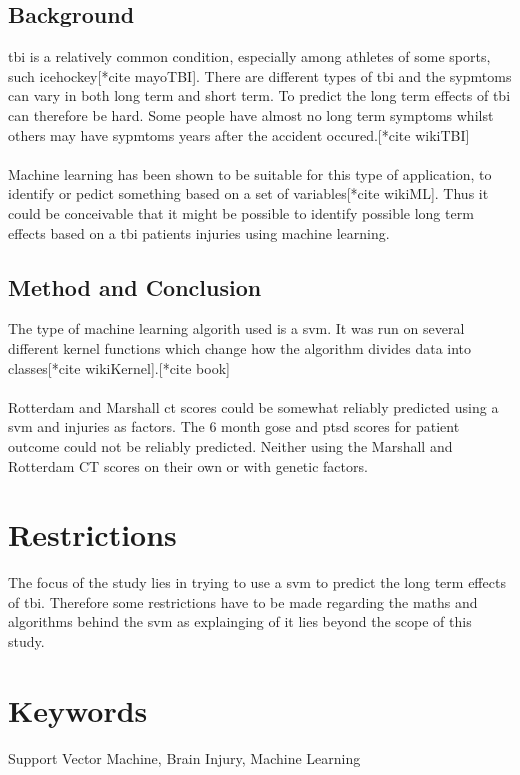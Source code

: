 \documentclass[11pt]{article}
\begin{document}
\subsection*{Background}

\gls{tbi} is a relatively common condition, especially among athletes of some sports, such icehockey[*cite mayoTBI]. There are different types of \gls{tbi} and the sypmtoms can vary in both long term and short term. To predict the long term effects of \gls{tbi} can therefore be hard. Some people have almost no long term symptoms whilst others may have sypmtoms years after the accident occured.[*cite wikiTBI]\\
\\
Machine learning has been shown to be suitable for this type of application, to identify or pedict something based on a set of variables[*cite wikiML]. Thus it could be conceivable that it might be possible to identify possible long term effects based on a \gls{tbi} patients injuries using machine learning.

\subsection*{Method and Conclusion}
The type of machine learning algorith used is a \gls{svm}. It was run on several different kernel functions which change how the algorithm divides data into classes[*cite wikiKernel].[*cite book]\\
\\
Rotterdam and Marshall \gls{ct} scores could be somewhat reliably predicted using a \gls{svm} and injuries as factors. The 6 month \gls{gose} and \gls{ptsd} scores for patient outcome could not be reliably predicted. Neither using the Marshall and Rotterdam CT scores on their own or with genetic factors.
\section*{Restrictions}
The focus of the study lies in trying to use a \gls{svm} to predict the long term effects of \gls{tbi}. Therefore some restrictions have to be made regarding the maths and algorithms behind the \gls{svm} as explainging of it lies beyond the scope of this study.

\section*{Keywords}
Support Vector Machine, Brain Injury, Machine Learning
\end{document}
